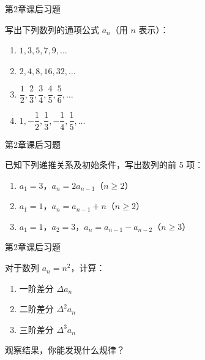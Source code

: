 \documentclass[aspectratio=169,10pt,fontset=fandol]{ctexbeamer}
\begin{document}
\begin{frame}[t,fragile]{第2章课后习题}
\normalsize
{\normalsize
写出下列数列的通项公式 \(a_n\)（用 \(n\) 表示）：

\begin{enumerate}

\item \(1, 3, 5, 7, 9, \dots\)

\item \(2, 4, 8, 16, 32, \dots\)

\item \(\dfrac{1}{2}, \dfrac{2}{3}, \dfrac{3}{4}, \dfrac{4}{5}, \dfrac{5}{6}, \dots\)

\item \(1, -\dfrac{1}{2}, \dfrac{1}{3}, -\dfrac{1}{4}, \dfrac{1}{5}, \dots\)

\end{enumerate}


}
\end{frame}
\begin{frame}[t,fragile]{第2章课后习题}
\normalsize
{\normalsize
已知下列递推关系及初始条件，写出数列的前 5 项：

\begin{enumerate}

\item \(a_1 = 3\)，\(a_n = 2a_{n-1}\)（\(n \geq 2\)）

\item \(a_1 = 1\)，\(a_n = a_{n-1} + n\)（\(n \geq 2\)）

\item \(a_1 = 1\)，\(a_2 = 3\)，\(a_n = a_{n-1} - a_{n-2}\)（\(n \geq 3\)）

\end{enumerate}


}
\end{frame}
\begin{frame}[t,fragile]{第2章课后习题}
\normalsize
{\normalsize
对于数列 \(a_n = n^2\)，计算：

\begin{enumerate}

\item 一阶差分 \(\Delta a_n\)

\item 二阶差分 \(\Delta^2 a_n\)

\item 三阶差分 \(\Delta^3 a_n\)

\end{enumerate}

观察结果，你能发现什么规律？


}
\end{frame}
\end{document}

